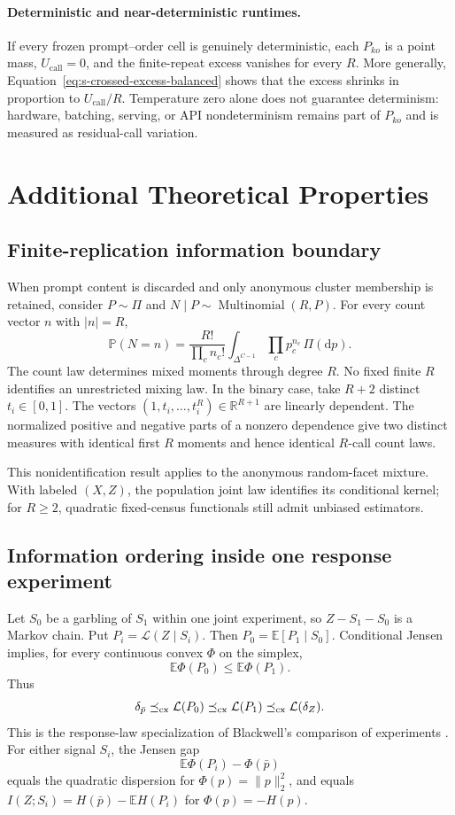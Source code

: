 \documentclass[letterpaper]{article}
\newcommand{\Law}{\mathcal L}
\newcommand{\E}{\mathbb E}
\newcommand{\Prob}{\mathbb P}
\newcommand{\1}{\mathbf 1}
\newcommand{\Uc}{U_{\mathrm{call}}}
\begin{document}
\paragraph{Deterministic and near-deterministic runtimes.}
If every frozen prompt--order cell is genuinely deterministic, each $P_{ko}$
is a point mass, $\Uc=0$, and the finite-repeat excess vanishes for every
$R$. More generally, Equation~\eqref{eq:s-crossed-excess-balanced} shows that
the excess shrinks in proportion to $\Uc/R$. Temperature zero alone does not
guarantee determinism: hardware, batching, serving, or API nondeterminism
remains part of $P_{ko}$ and is measured as residual-call variation.

\section{Additional Theoretical Properties}

\subsection{Finite-replication information boundary}

When prompt content is discarded and only anonymous cluster membership is
retained, consider $P\sim\Pi$ and
$N\mid P\sim\operatorname{Multinomial}(R,P)$. For every count vector $n$
with $|n|=R$,
\[
\Prob(N=n)=\frac{R!}{\prod_cn_c!}
\int_{\Delta^{C-1}}\prod_cp_c^{n_c}\,\Pi(\mathrm dp).
\]
The count law determines mixed moments through degree $R$. No fixed finite
$R$ identifies an unrestricted mixing law. In the binary case, take $R+2$
distinct $t_i\in[0,1]$. The vectors
$(1,t_i,\ldots,t_i^R)\in\mathbb R^{R+1}$ are linearly dependent. The
normalized positive and negative parts of a nonzero dependence give two
distinct measures with identical first $R$ moments and hence identical
$R$-call count laws.

This nonidentification result applies to the anonymous random-facet mixture.
With labeled $(X,Z)$, the population joint law identifies its conditional
kernel; for $R\ge2$, quadratic fixed-census functionals still admit unbiased
estimators.

\subsection{Information ordering inside one response experiment}

Let $S_0$ be a garbling of $S_1$ within one joint experiment, so
$Z-S_1-S_0$ is a Markov chain. Put
$P_i=\Law(Z\mid S_i)$. Then
$P_0=\E[P_1\mid S_0]$. Conditional Jensen implies, for every continuous
convex $\Phi$ on the simplex,
\[
\E\Phi(P_0)\le\E\Phi(P_1).
\]
Thus
\[
\delta_{\bar p}\preceq_{\rm cx}\Law(P_0)
\preceq_{\rm cx}\Law(P_1)\preceq_{\rm cx}\Law(\delta_Z).
\]
This is the response-law specialization of Blackwell's
comparison of experiments \citep{blackwell1953equivalent,kamenica2011persuasion}.
For either signal $S_i$, the Jensen gap
\[
\E\Phi(P_i)-\Phi(\bar p)
\]
equals the quadratic dispersion for $\Phi(p)=\|p\|_2^2$, and equals
$I(Z;S_i)=H(\bar p)-\E H(P_i)$ for $\Phi(p)=-H(p)$.
\end{document}
